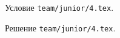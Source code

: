 \problem
Условие \texttt{team/junior/4.tex}.

\solution Решение \texttt{team/junior/4.tex}.
\endproblem
